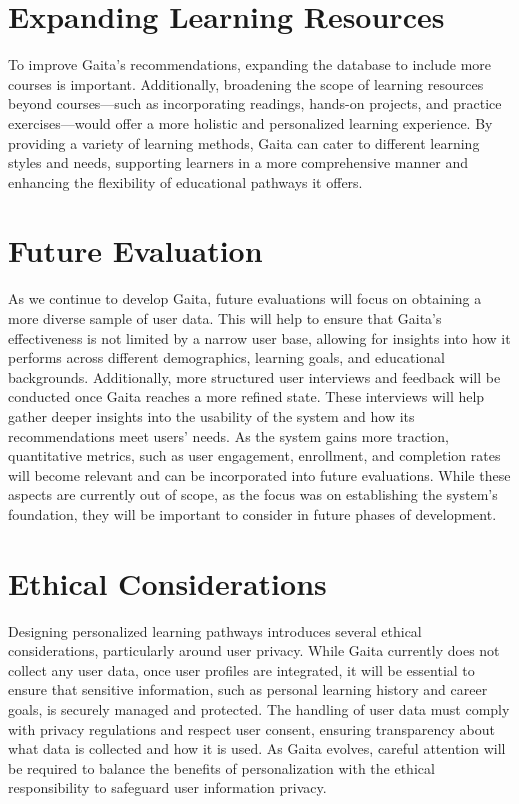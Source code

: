 \section{Expanding Learning Resources}

To improve Gaita’s recommendations, expanding the database to include more courses is important. Additionally, broadening the scope of learning resources beyond courses—such as incorporating readings, hands-on projects, and practice exercises—would offer a more holistic and personalized learning experience. By providing a variety of learning methods, Gaita can cater to different learning styles and needs, supporting learners in a more comprehensive manner and enhancing the flexibility of educational pathways it offers.

\section{Future Evaluation}

As we continue to develop Gaita, future evaluations will focus on obtaining a more diverse sample of user data. This will help to ensure that Gaita’s effectiveness is not limited by a narrow user base, allowing for insights into how it performs across different demographics, learning goals, and educational backgrounds. Additionally, more structured user interviews and feedback will be conducted once Gaita reaches a more refined state. These interviews will help gather deeper insights into the usability of the system and how its recommendations meet users' needs. As the system gains more traction, quantitative metrics, such as user engagement, enrollment, and completion rates will become relevant and can be incorporated into future evaluations. While these aspects are currently out of scope, as the focus was on establishing the system’s foundation, they will be important to consider in future phases of development.

\section{Ethical Considerations}
Designing personalized learning pathways introduces several ethical considerations, particularly around user privacy. While Gaita currently does not collect any user data, once user profiles are integrated, it will be essential to ensure that sensitive information, such as personal learning history and career goals, is securely managed and protected. The handling of user data must comply with privacy regulations and respect user consent, ensuring transparency about what data is collected and how it is used. As Gaita evolves, careful attention will be required to balance the benefits of personalization with the ethical responsibility to safeguard user information privacy. 